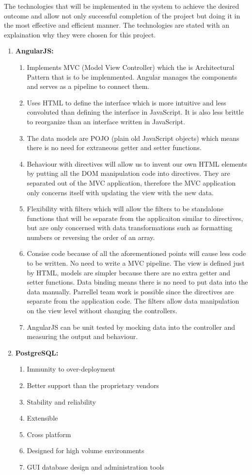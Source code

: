 The technologies that will be implemented in the system to achieve the desired outcome and allow not only successful completion of the project but doing it in the most effective and efficient manner. The technologies are stated with an explaination why they were chosen for this project.
	\begin{enumerate}
		\item \textbf{AngularJS:} 
		\begin{enumerate}
			\item Implements MVC (Model View Controller) which the is Architectural Pattern that is to be implenmented. Angular manages the components and serves as a pipeline to connect them.
			\item Uses HTML to define the interface which is more intuitive and less convoluted than defining the interface in JavaScript. It is also less brittle to reorganize than an interface written in JavaScript.
			\item The data models are POJO (plain old JavaScript objects) which means there is no need for extraneous getter and setter functions.
			\item Behaviour with directives will allow us to invent our own HTML elements by putting all the DOM manipulation code into directives. They are separated out of the MVC application, therefore the MVC application only concerns itself with updating the view with the new data.
			\item Flexibility with filters which will allow the filters to be standalone functions that will be separate from the applicaiton similar to directives, but are only concerned with data transformations such as formatting numbers or reversing the order of an array.
			\item Consise code because of all the aforementioned points will cause less code to be written. No need to write a MVC pipeline. The view is defined just by HTML, models are simpler because there are no extra getter and setter functions. Data binding means there is no need to put data into the data manually. Parrellel team work is possible since the directives are separate from the application code. The filters allow data manipulation on the view level without changing the controllers.
			\item AngularJS can be unit tested by mocking data into the controller and measuring the output and behaviour.
		\end{enumerate}
		
		\item \textbf{PostgreSQL:}
		\begin{enumerate}
			\item Immunity to over-deployment 
			\item Better support than the proprietary vendors 
			\item Stability and reliability
			\item Extensible 
			\item Cross platform
			\item Designed for high volume environments
			\item GUI database design and administration tools
		\end{enumerate} 
		

\end{enumerate}
